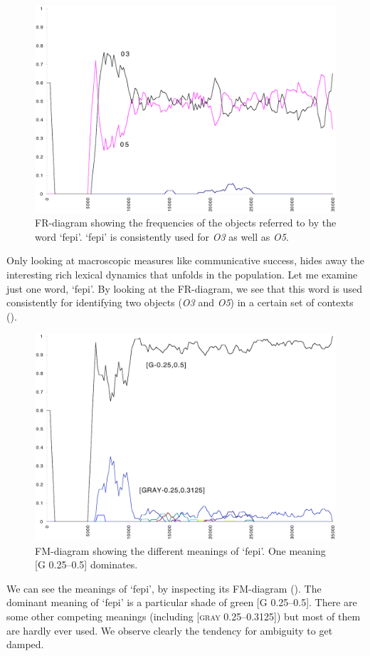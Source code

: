 \begin{figure}[htbp]
  \centerline{\includegraphics[width=.80\textwidth]{chap7/figs/FR-FEPI.pdf}}
\caption{\label{fr-fepi}FR-diagram showing the frequencies
of the objects referred to by the word
`fepi'. `fepi' is consistently used for \emph{O3} as well as
\emph{O5}.}
\end{figure}
Only looking at macroscopic measures like communicative
success, hides away the
interesting rich lexical dynamics that unfolds
in the population. Let me examine just one word, `fepi'. 
By looking at the FR-diagram, we see that this word is 
used consistently for identifying two objects
(\emph{O3} and \emph{O5}) in a certain set of contexts
(). 

\begin{figure}[htbp]
  \centerline{\includegraphics[width=.80\textwidth]{chap7/figs/FM-FEPI.pdf}}
\caption{\label{fm-fepi}FM-diagram showing the different
meanings of `fepi'. One meaning [G 0.25–0.5] dominates.}
\end{figure}
We can see the meanings of `fepi', by 
inspecting its FM-diagram (). 
The dominant meaning of `fepi' is 
a particular shade of green [G 0.25–0.5]. There are 
some other competing meanings (including [\textsc{gray} 0.25–0.3125])
but most of them are hardly ever used. We observe clearly 
the tendency for ambiguity to get damped. 

